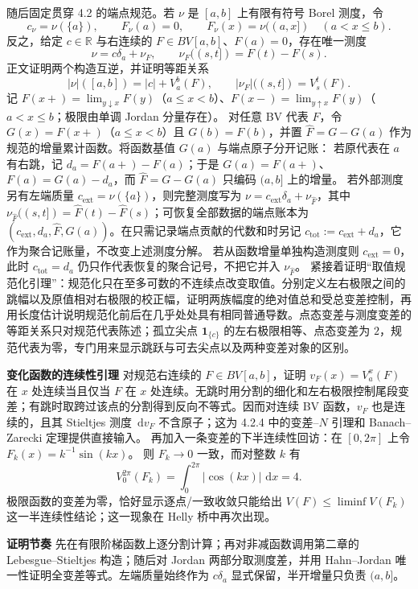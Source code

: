 \documentclass[11pt,a4paper]{ctexart}
\newcommand{\R}{\mathbb R}
\newcommand{\dd}{\,\mathrm d}
\newcommand{\planitem}[1]{\par\smallskip\noindent\textcolor{deepblue}{\textbf{#1}}\quad}
\begin{document}
随后固定贯穿 4.2 的端点规范。若 $\nu$ 是 $[a,b]$ 上有限有符号 Borel 测度，令
\[
c_\nu=\nu(\{a\}),\qquad F_\nu(a)=0,
\qquad F_\nu(x)=\nu((a,x])\quad(a<x\le b).
\]
反之，给定 $c\in\R$ 与右连续的 $F\in BV[a,b]$、$F(a)=0$，存在唯一测度
\[
\nu=c\delta_a+\nu_F,\qquad
\nu_F((s,t])=F(t)-F(s).
\]
正文证明两个构造互逆，并证明等距关系
\[
|\nu|([a,b])=|c|+V_a^b(F),
\qquad
|\nu_F|((s,t])=V_s^t(F).
\]
记 $F(x+)=\lim_{y\downarrow x}F(y)$（$a\le x<b$）、$F(x-)=\lim_{y\uparrow x}F(y)$（$a<x\le b$；极限由单调 Jordan 分量存在）。
对任意 BV 代表 $F$，令 $G(x)=F(x+)$（$a\le x<b$）且 $G(b)=F(b)$，并置
$\widehat F=G-G(a)$ 作为规范的增量累计函数。将函数基值 $G(a)$ 与端点原子分开记账：
若原代表在 $a$ 有右跳，记 $d_a=F(a+)-F(a)$；于是 $G(a)=F(a+)$、
$F(a)=G(a)-d_a$，而 $\widehat F=G-G(a)$ 只编码 $(a,b]$ 上的增量。
若外部测度另有左端质量 $c_{\mathrm{ext}}=\nu(\{a\})$，则完整测度写为
$\nu=c_{\mathrm{ext}}\delta_a+\nu_{\widehat F}$，其中
$\nu_{\widehat F}((s,t])=\widehat F(t)-\widehat F(s)$；可恢复全部数据的端点账本为
$(c_{\mathrm{ext}},d_a,\widehat F,G(a))$。在只需记录端点贡献的代数和时另记
$c_{\mathrm{tot}}:=c_{\mathrm{ext}}+d_a$，它作为聚合记账量，不改变上述测度分解。
若从函数增量单独构造测度则 $c_{\mathrm{ext}}=0$，此时
$c_{\mathrm{tot}}=d_a$ 仍只作代表恢复的聚合记号，不把它并入 $\nu_{\widehat F}$。
紧接着证明“取值规范化引理”：规范化只在至多可数的不连续点改变取值。分别定义左右极限之间的跳幅以及原值相对右极限的校正幅，证明两族幅度的绝对值总和受总变差控制，再用长度估计说明规范化前后在几乎处处具有相同普通导数。点态变差与测度变差的等距关系只对规范代表陈述；孤立尖点 $\mathbf1_{\{c\}}$ 的左右极限相等、点态变差为 $2$，规范代表为零，专门用来显示跳跃与可去尖点以及两种变差对象的区别。

\planitem{变化函数的连续性引理}
对规范右连续的 $F\in BV[a,b]$，证明 $v_F(x)=V_a^x(F)$ 在 $x$ 处连续当且仅当 $F$ 在 $x$ 处连续。无跳时用分割的细化和左右极限控制尾段变差；有跳时取跨过该点的分割得到反向不等式。因而对连续 BV 函数，$v_F$ 也是连续的，且其 Stieltjes 测度 $\dd v_F$ 不含原子；这为 4.2.4 中的变差--$N$ 引理和 Banach--Zarecki 定理提供直接输入。
再加入一条变差的下半连续性回访：在 $[0,2\pi]$ 上令 $F_k(x)=k^{-1}\sin(kx)$。
则 $F_k\to0$ 一致，而对整数 $k$ 有
\[
 V_0^{2\pi}(F_k)=\int_0^{2\pi}|\cos(kx)|\,\dd x=4.
\]
极限函数的变差为零，恰好显示逐点/一致收敛只能给出
$V(F)\le\liminf V(F_k)$ 这一半连续性结论；这一现象在 Helly 桥中再次出现。

\planitem{证明节奏}
先在有限阶梯函数上逐分割计算；再对非减函数调用第二章的 Lebesgue--Stieltjes 构造；随后对 Jordan 两部分取测度差，并用 Hahn--Jordan 唯一性证明全变差等式。左端质量始终作为 $c\delta_a$ 显式保留，半开增量只负责 $(a,b]$。
\end{document}
